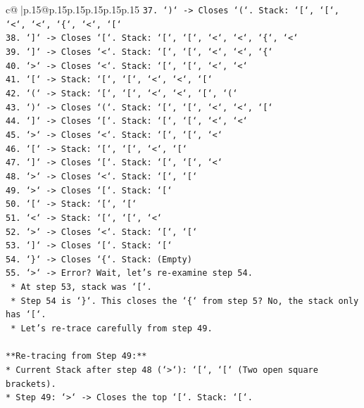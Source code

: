 \documentclass{article}
\begin{document}
{\begin{supertabular}{c@{$\;$}|p{.15\linewidth}@{}p{.15\linewidth}p{.15\linewidth}p{.15\linewidth}p{.15\linewidth}p{.15\linewidth}}
{{{\texttt{37. `)` {-}> Closes `(`. Stack: `{[}`, `{[}`, `<`, `<`, `\{`, `<`, `{[}`} \\
\texttt{38. `{]}` {-}> Closes `{[}`. Stack: `{[}`, `{[}`, `<`, `<`, `\{`, `<`} \\
\texttt{39. `{]}` {-}> Closes `<`. Stack: `{[}`, `{[}`, `<`, `<`, `\{`} \\
\texttt{40. `>` {-}> Closes `<`. Stack: `{[}`, `{[}`, `<`, `<`} \\
\texttt{41. `{[}` {-}> Stack: `{[}`, `{[}`, `<`, `<`, `{[}`} \\
\texttt{42. `(` {-}> Stack: `{[}`, `{[}`, `<`, `<`, `{[}`, `(`} \\
\texttt{43. `)` {-}> Closes `(`. Stack: `{[}`, `{[}`, `<`, `<`, `{[}`} \\
\texttt{44. `{]}` {-}> Closes `{[}`. Stack: `{[}`, `{[}`, `<`, `<`} \\
\texttt{45. `>` {-}> Closes `<`. Stack: `{[}`, `{[}`, `<`} \\
\texttt{46. `{[}` {-}> Stack: `{[}`, `{[}`, `<`, `{[}`} \\
\texttt{47. `{]}` {-}> Closes `{[}`. Stack: `{[}`, `{[}`, `<`} \\
\texttt{48. `>` {-}> Closes `<`. Stack: `{[}`, `{[}`} \\
\texttt{49. `>` {-}> Closes `{[}`. Stack: `{[}`} \\
\texttt{50. `{[}` {-}> Stack: `{[}`, `{[}`} \\
\texttt{51. `<` {-}> Stack: `{[}`, `{[}`, `<`} \\
\texttt{52. `>` {-}> Closes `<`. Stack: `{[}`, `{[}`} \\
\texttt{53. `{]}` {-}> Closes `{[}`. Stack: `{[}`} \\
\texttt{54. `\}` {-}> Closes `\{`. Stack: (Empty)} \\
\texttt{55. `>` {-}> Error? Wait, let's re{-}examine step 54.} \\
\texttt{    *   At step 53, stack was `{[}`.} \\
\texttt{    *   Step 54 is `\}`. This closes the `\{` from step 5? No, the stack only has `{[}`.} \\
\texttt{    *   Let's re{-}trace carefully from step 49.} \\
\\ 
\texttt{**Re{-}tracing from Step 49:**} \\
\texttt{*   Current Stack after step 48 (`>`): `{[}`, `{[}` (Two open square brackets).} \\
\texttt{*   Step 49: `>` {-}> Closes the top `{[}`. Stack: `{[}`.} \\
}}}
\end{supertabular}}
\end{document}
